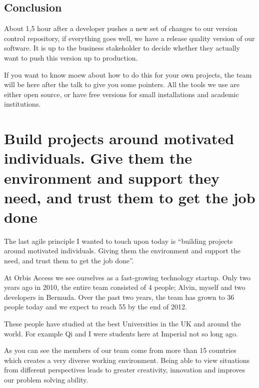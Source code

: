 \documentclass{article}
\begin{document}
\subsection{Conclusion}
About 1,5 hour after a developer pushes a new set of changes to our
version control repository, if everything goes well, we have a release
quality version of our software.
%
It is up to the business stakeholder to decide whether they actually
want to push this version up to production.

If you want to know moew about how to do this for your own projects,
the team will be here after the talk to give you some pointers.
%
All the tools we use are either open source, or have free versions for
small installations and academic institutions.


\section{Build projects around motivated individuals. Give them the environment and support they need, and trust them to get the job done}

The last agile principle I wanted to touch upon today is ``building
projects around motivated individuals. Giving them the environment and
support the need, and trust them to get the job done''.

At Orbis Access we see ourselves as a fast-growing technology startup.
%
Only two years ago in 2010, the entire team consisted of 4 people;
Alvin, myself and two developers in Bermuda.
%
Over the past two years, the team has grown to 36 people today and we
expect to reach 55 by the end of 2012.

These people have studied at the best Universities in the UK and
around the world.
%
For example Qi and I were students here at Imperial not so long ago.

As you can see the members of our team come from more than 15
countries which creates a very diverse working environment.
%
Being able to view situations from different perspectives leads to
greater creativity, innovation and improves our problem solving
ability.
\end{document}
